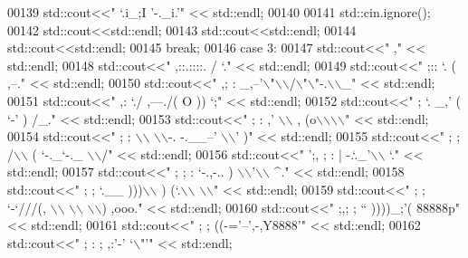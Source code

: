 \begin{DoxyCode}
00139 std::cout<<\textcolor{stringliteral}{"       `.i\_;I  '-.\_i.'"}         << std::endl;
00140 
00141 std::cin.ignore();
00142 std::cout<<std::endl;
00143 std::cout<<std::endl;
00144 std::cout<<std::endl;
00145             \textcolor{keywordflow}{break};
00146         \textcolor{keywordflow}{case} 3:
00147 std::cout<<\textcolor{stringliteral}{"                               ,"}         << std::endl;
00148 std::cout<<\textcolor{stringliteral}{"         ,::.::::.            / `."}         << std::endl;
00149 std::cout<<\textcolor{stringliteral}{"       ;::        `.         (  ,--."}         << std::endl;
00150 std::cout<<\textcolor{stringliteral}{"       ,;           :   \_,--'\(\backslash\)"\(\backslash\)\(\backslash\)/\(\backslash\)"\(\backslash\)"-.\(\backslash\)\(\backslash\)\_"}         << std::endl;
00151 std::cout<<\textcolor{stringliteral}{"      ,:             `./ ,---./( O )) `;"}         << std::endl;
00152 std::cout<<\textcolor{stringliteral}{"      ;  `.           \_,'    (  `-' ) /\_."}         << std::endl;
00153 std::cout<<\textcolor{stringliteral}{"      ;   :         ,'        \(\backslash\)\(\backslash\)    , (o\(\backslash\)\(\backslash\)\(\backslash\)\(\backslash\)"}         << std::endl;
00154 std::cout<<\textcolor{stringliteral}{"       ;  :         \(\backslash\)\(\backslash\)  \(\backslash\)\(\backslash\)-.  -.\_\_--'   \(\backslash\)\(\backslash\)' )"}         << std::endl;
00155 std::cout<<\textcolor{stringliteral}{"       ;  ;         /\(\backslash\)\(\backslash\) (    `-.\_`-.\_   \(\backslash\)\(\backslash\)/"}         << std::endl;
00156 std::cout<<\textcolor{stringliteral}{"        ';,        ; : |      -.`.\_'\(\backslash\)\(\backslash\)   `."}         << std::endl;
00157 std::cout<<\textcolor{stringliteral}{"          ;       ;  : `-.,-..  )  \(\backslash\)\(\backslash\)'\(\backslash\)\(\backslash\)   ^."}         << std::endl;
00158 std::cout<<\textcolor{stringliteral}{"           ;     ;   `.\_\_   )))\(\backslash\)\(\backslash\) ) (`.\(\backslash\)\(\backslash\)    \(\backslash\)\(\backslash\)"}         << std::endl;
00159 std::cout<<\textcolor{stringliteral}{"            ;   ;        `-`///(, \(\backslash\)\(\backslash\) \(\backslash\)\(\backslash\) \(\backslash\)\(\backslash\))  ,ooo."}         << std::endl;
00160 std::cout<<\textcolor{stringliteral}{"             ;,;      ;     ``  ))))\_;'(  88888p"}         << std::endl;
00161 std::cout<<\textcolor{stringliteral}{"              ;      ;         ((-='--',-,Y8888'"}         << std::endl;
00162 std::cout<<\textcolor{stringliteral}{"              ;     :         ;     ,:'-'  `\(\backslash\)"'"}         << std::endl;

\end{DoxyCode}
